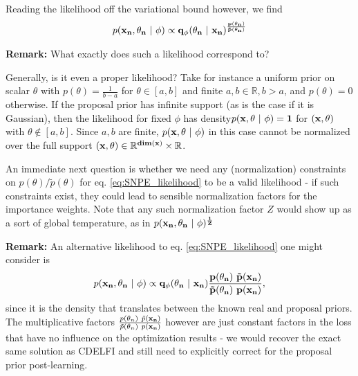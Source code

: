\documentclass[10pt,english]{article}
\begin{document}
Reading the likelihood off the variational bound however, we find
\begin{align}
p( \bf{x}_n, \theta_n \ | \ \phi) \propto q_\phi(\theta_n \ | \ \bf{x}_n)^\frac{p(\theta_n)}{\tilde{p}(\theta_n)}
\label{eq:SNPE_likelihood}
\end{align}

\begin{framed}
\noindent{}\textbf{Remark:} What exactly does such a likelihood correspond to? 

Generally, is it even a proper likelihood? 
Take for instance a uniform prior on scalar $\theta$ with $p(\theta) = \frac{1}{b-a}$ for $\theta \in [a,b]$ and finite $a,b\in\mathbb{R}, b>a$, and $p(\theta) = 0$ otherwise. 
If the proposal prior has infinite support (as is the case if it is Gaussian), then the likelihood for fixed $\phi$ has density$p(\bf{x}, \theta \ | \ \phi) = 1$
for $(\bf{x}, \theta)$ with $\theta \notin [a,b]$.
Since $a,b$ are finite, $p(\bf{x}, \theta \ | \ \phi)$ in this case cannot be normalized over the full support $(\bf{x}, \theta) \in \mathbb{R}^{dim(\bf{x})} \times \mathbb{R}$. 

An immediate next question is whether we need any (normalization) constraints on $p(\theta)/\tilde{p}(\theta)$ for eq. \ref{eq:SNPE_likelihood} to be a valid likelihood - if such constraints exist, they could lead to sensible normalization factors for the importance weights. 
Note that any such normalization factor $Z$ would show up as a sort of global temperature, as in $p( \bf{x}_n, \theta_n \ | \ \phi)^{\frac{1}{Z}}$
\end{framed}

\begin{framed}
\noindent{}\textbf{Remark:} An alternative likelihood to eq. \ref{eq:SNPE_likelihood} one might consider is 
\begin{align}
p( \bf{x}_n, \theta_n \ | \ \phi) \propto q_\phi(\theta_n \ | \ \bf{x}_n) \frac{p(\theta_n) \ \tilde{p}(\bf{x}_n)}{\tilde{p}(\theta_n) \ p(\bf{x}_n)},
\end{align}
since it is the density that translates between the known real and proposal priors. 
The multiplicative factors $\frac{p(\theta_n) \ \tilde{p}(\bf{x}_n)}{\tilde{p}(\theta_n) \ p(\bf{x}_n)}$ however are just constant factors in the loss that have no influence on the optimization results - we would recover the exact same solution as CDELFI and still need to explicitly correct for the proposal prior post-learning. 
\end{framed}
\end{document}
